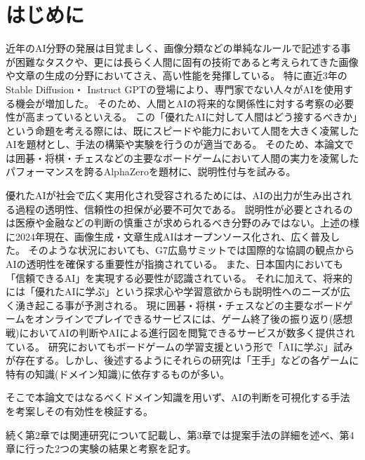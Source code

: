 \chapter{はじめに}
近年のAI分野の発展は目覚ましく、画像分類などの単純なルールで記述する事が困難なタスクや、更には長らく人間に固有の技術であると考えられてきた画像や文章の生成の分野においてさえ、高い性能を発揮している\cite{cat}。
特に直近3年のStable Diffusion\cite{diffusion}・ Instruct GPT\cite{GPT}の登場により、専門家でない人々がAIを使用する機会が増加した。
そのため、人間とAIの将来的な関係性に対する考察の必要性が高まっているといえる。
この「優れたAIに対して人間はどう接するべきか」という命題を考える際には、既にスピードや能力において人間を大きく凌駕したAIを題材とし、手法の構築や実験を行うのが適当である。
そのため、本論文では囲碁・将棋・チェスなどの主要なボードゲームにおいて人間の実力を凌駕したパフォーマンスを誇るAlphaZero\cite{AlphaZero}を題材に、説明性付与を試みる。

優れたAIが社会で広く実用化され受容されるためには、AIの出力が生み出される過程の透明性、信頼性の担保が必要不可欠である。
説明性が必要とされるのは医療や金融などの判断の慎重さが求められるべき分野のみではない。上述の様に2024年現在、画像生成・文章生成AIはオープンソース化され、広く普及した。
そのような状況においても、G7広島サミットでは国際的な協調の観点からAIの透明性を確保する重要性が指摘されている\cite{Hiroshima}。
また、日本国内においても「信頼できるAI」を実現する必要性が認識されている\cite{グランドデザイン}。
それに加えて、将来的には「優れたAIに学ぶ」という探求心や学習意欲からも説明性へのニーズが広く湧き起こる事が予測される。
現に囲碁・将棋・チェスなどの主要なボードゲームをオンラインでプレイできるサービスには、ゲーム終了後の振り返り(感想戦)においてAIの判断やAIによる進行図を閲覧できるサービスが数多く提供されている\cite{panda}\cite{wars}。
研究においてもボードゲームの学習支援という形で「AIに学ぶ」試みが存在する。しかし、後述するようにそれらの研究は「王手」などの各ゲームに特有の知識(ドメイン知識)に依存するものが多い。

そこで本論文ではなるべくドメイン知識を用いず、AIの判断を可視化する手法を考案しその有効性を検証する。

続く第2章では関連研究について記載し、第3章では提案手法の詳細を述べ、第4章に行った2つの実験の結果と考察を記す。

